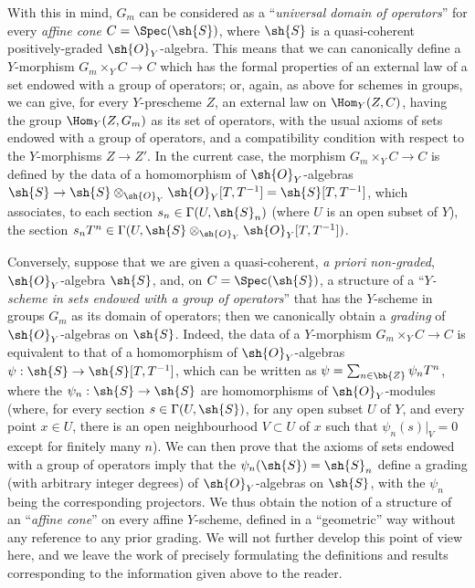 \begin{remark}[8.3.9]
With this in mind, $G_m$ can be considered as a ``\emph{universal domain of operators}'' for every \emph{affine cone} $C=\Spec(\sh{S})$, where $\sh{S}$ is a quasi-coherent positively-graded $\sh{O}_Y$-algebra.
This means that we can canonically define a $Y$-morphism $G_m\times_Y C\to C$ which has the formal properties of an external law of a set endowed with a group of operators;
or, again, as above for schemes in groups, we can give, for every $Y$-prescheme $Z$, an external law on $\Hom_Y(Z,C)$, having the group $\Hom_Y(Z,G_m)$ as its set of operators, with the usual axioms of sets endowed with a group of operators, and a compatibility condition with respect to the $Y$-morphisms $Z\to Z'$.
In the current case, the morphism $G_m\times_Y C\to C$ is defined by the data of a homomorphism of $\sh{O}_Y$-algebras $\sh{S} \to \sh{S}\otimes_{\sh{O}_Y}\sh{O}_Y[T,T^{-1}] = \sh{S}[T,T^{-1}]$, which associates, to each section $s_n\in\Gamma(U,\sh{S}_n)$ (where $U$ is an open subset of $Y$), the section $s_n T^n\in\Gamma(U,\sh{S}\otimes_{\sh{O}_Y}\sh{O}_Y[T,T^{-1}])$.

Conversely, suppose that we are given a quasi-coherent, \emph{a priori non-graded}, $\sh{O}_Y$-algebra $\sh{S}$, and, on $C=\Spec(\sh{S})$, a structure of a ``\emph{$Y$-scheme in sets endowed with a group of operators}'' that has the $Y$-scheme in groups $G_m$ as its domain of operators;
then we canonically obtain a \emph{grading} of $\sh{O}_Y$-algebras on $\sh{S}$.
Indeed, the data of a $Y$-morphism $G_m\times_Y C\to C$ is equivalent to that of a homomorphism of $\sh{O}_Y$-algebras $\psi:\sh{S}\to\sh{S}[T,T^{-1}]$, which can be written as $\psi=\sum_{n\in\bb{Z}}\psi_n T^n$, where the $\psi_n:\sh{S}\to\sh{S}$ are homomorphisms of $\sh{O}_Y$-modules (where, for every section $s\in\Gamma(U,\sh{S})$, for any open subset $U$ of $Y$, and every point $x\in U$, there is an open neighbourhood $V\subset U$ of $x$ such that $\psi_n(s)|_V=0$ except for finitely many $n$).
We can then prove that the axioms of sets endowed with a group of operators imply that the $\psi_n(\sh{S})=\sh{S}_n$ define a grading (with arbitrary integer degrees) of $\sh{O}_Y$-algebras on $\sh{S}$, with the $\psi_n$ being the corresponding projectors.
We thus obtain the notion of a structure of an ``\emph{affine cone}'' on every affine $Y$-scheme, defined in a ``geometric'' way without any reference to any prior grading.
We will not further develop this point of view here, and we leave the work of precisely formulating the definitions and results corresponding to the information given above to the reader.
\end{remark}



